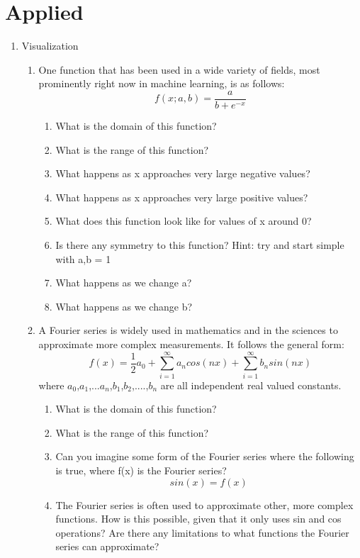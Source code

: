 \documentclass{article}
\begin{document}
\section{Applied}
\begin{enumerate}
    \item Visualization
    \begin{enumerate}
        \item One function that has been used in a wide variety of fields, most prominently right now in machine learning, is as follows:
        \[ f(x;a,b) = \frac{a}{b+e^{-x}}\]
        \begin{enumerate}
            \item What is the domain of this function?
            \item What is the range of this function?
            \item What happens as x approaches very large negative values?
            \item What happens as x approaches very large positive values?
            \item What does this function look like for values of x around 0?
            \item Is there any symmetry to this function? Hint: try and start simple with a,b = 1
            \item What happens as we change a?
            \item What happens as we change b?
        \end{enumerate}
        \item A Fourier series is widely used in mathematics and in the sciences to approximate more complex measurements. It follows the general form: 
        \[ f(x) = \frac{1}{2} a_0 + \sum\limits_{i=1}^\infty a_n cos(nx) + \sum\limits_{i=1}^\infty b_n sin(nx)\]
        where $a_0$,$a_1$,...$a_n$,$b_1$,$b_2$,....,$b_n$ are all independent real valued constants. 
        \begin{enumerate}
            \item What is the domain of this function?
            \item What is the range of this function?
            \item Can you imagine some form of the Fourier series where the following is true, where f(x) is the Fourier series?
            \[ sin(x) = f(x)\]
            \item The Fourier series is often used to approximate other, more complex functions. How is this possible, given that it only uses sin and cos operations? Are there any limitations to what functions the Fourier series can approximate?

\end{enumerate}
\end{enumerate}
\end{enumerate}
\end{document}
